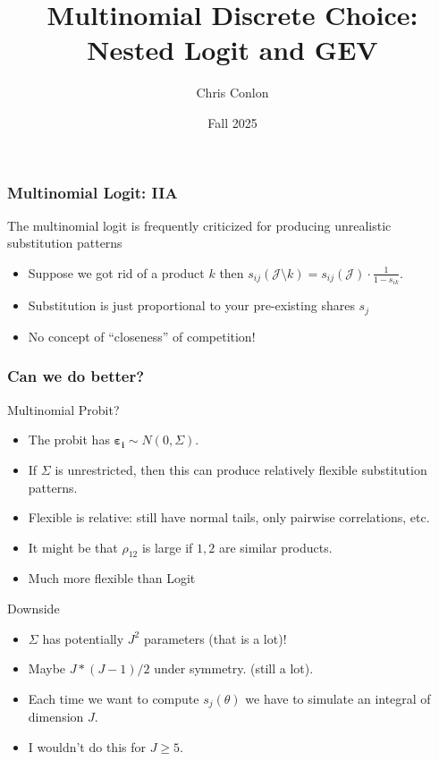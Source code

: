 \documentclass[aspectratio=169,11pt]{beamer}
\begin{document}
\title{Multinomial Discrete Choice: Nested Logit and GEV}
\author{Chris Conlon}
\date{Fall 2025}

\frame{\titlepage}

\begin{frame}
\frametitle{Multinomial Logit: IIA}
The multinomial logit is frequently criticized for producing unrealistic substitution patterns
\begin{itemize}
\item Suppose we got rid of a product $k$ then $s_{ij}(\mathcal{J}\setminus k) = s_{ij}(\mathcal{J})\cdot \frac{1}{1- s_{ik}}$.
\item Substitution is just proportional to your pre-existing shares $s_j$
\item No concept of ``closeness'' of competition!
\end{itemize}
\end{frame}


\begin{frame}
\frametitle{Can we do better?}
Multinomial Probit?
\begin{itemize}
\item The probit has $\boldsymbol{\varepsilon_i} \sim N(0,\Sigma)$.
\item If $\Sigma$ is unrestricted, then this can produce relatively flexible substitution patterns.
\item Flexible is relative: still have normal tails, only pairwise correlations, etc.
\item It might be that $\rho_{12}$ is large if $1,2$ are similar products.
\item Much more flexible than Logit
\end{itemize}
Downside
\begin{itemize}
\item $\Sigma$ has potentially $J^2$ parameters (that is a lot)!
\item Maybe $J * (J-1)/2$ under symmetry. (still a lot).
\item Each time we want to compute $s_j(\theta)$ we have to simulate an integral of dimension $J$.
\item I wouldn't do this for $J \geq 5$.
\end{itemize}
\end{frame}
\end{document}
